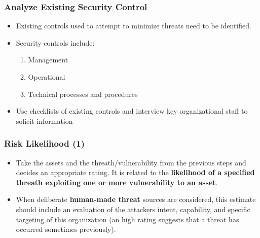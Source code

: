 \documentclass[xcolor ={table,usenames,dvipsnames}]{beamer}
\theoremstyle{definition}
\begin{document}
	\begin{frame}
		\frametitle{Analyze Existing Security Control } 
		\begin{itemize}
			\item Existing controls used to attempt to minimize threats need to be identified.
			\item Security controls include:
			\begin{enumerate}
				\item Management
				\item Operational
				\item Technical processes and procedures
			\end{enumerate}
			\item Use checklists of existing controls and interview key organizational staff to solicit information
		\end{itemize}
	\end{frame}

	\begin{frame}
		\frametitle{Risk Likelihood (1)}
		\begin{itemize}
			\item Take the assets and the threath/vulnerability from the previous steps and decides an appropriate rating. It is related to the \textbf{likelihood of a specified threath exploiting one or more vulnerability to an asset}.
			\item When deliberate \textbf{human-made threat} sources are considered, this
			estimate should include an evaluation of the attackers intent, capability, and specific targeting of this organization (an high rating suggests that a threat has occurred sometimes previously).
		\end{itemize}
	\end{frame}
\end{document}
